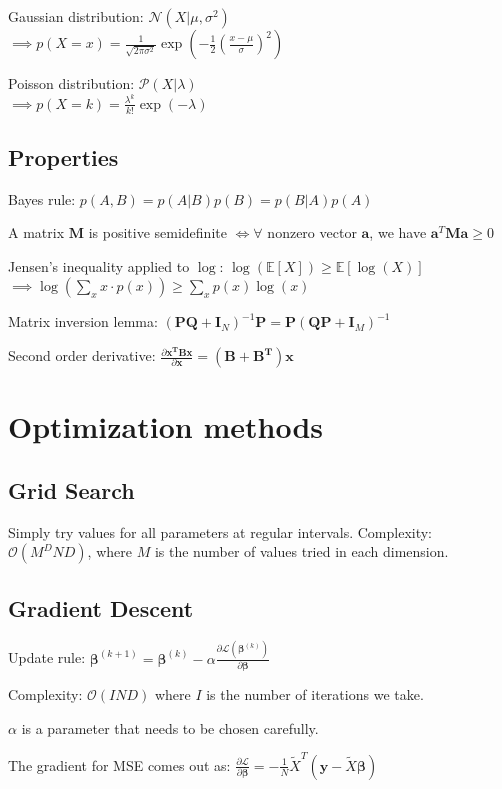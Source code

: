 \documentclass[10pt,a4paper,landscape]{article}
\providecommand{\bf}[1]{\ensuremath{\mathbf{#1}}}
\newcommand{\bbeta}{\boldsymbol\beta}
\begin{document}
\begin{multicols*}{4}
Gaussian distribution: $\mathcal{N}(X| \mu, \sigma^2)$ \\
$\implies p(X = x) = \frac{1}{\sqrt{2 \pi \sigma^2}} \exp{(- \frac{1}{2} ( \frac{x - \mu}{\sigma} )^2)}$

Poisson distribution: $\mathcal{P}(X| \lambda)$ \\
$\implies p(X = k) = \frac{\lambda ^ k}{k!} \exp{(- \lambda)}$

\subsection{Properties}
Bayes rule: $p(A, B) = p(A|B) p(B) = p(B|A) p(A)$

A matrix $\bf{M}$ is positive semidefinite $\iff \forall$ nonzero vector $\bf{a}$, we have $\bf{a}^T \bf{M} \bf{a} \geq 0$

Jensen's inequality applied to $\log$: $\log( \mathbb{E}[X] ) \geq \mathbb{E}[\log(X)]$ \\
$\implies \log ( \sum_x x \cdot p(x) ) \geq \sum_x p(x) \log(x)$

Matrix inversion lemma: $(\bf{PQ} + \bf{I}_N)^{-1} \bf{P} = \bf{P}(\bf{QP} + \bf{I}_M)^{-1}$

Second order derivative: $\frac{\partial \bf{x^T B x}}{\partial \bf{x}} = (\bf{B + B^T}) \bf{x}$

\section{Optimization methods}

\subsection{Grid Search}
Simply try values for all parameters at regular intervals.
Complexity: $\mathcal{O}(M^D N D)$, where $M$ is the number of values tried in each dimension.

\subsection{Gradient Descent}
Update rule: $\bbeta^{(k+1)} = \bbeta^{(k)} - \alpha \frac{\partial \mathcal{L}(\bbeta^{(k)})}{\partial \bbeta}$

Complexity: $\mathcal{O}(I N D)$ where $I$ is the number of iterations we take.

$\alpha$ is a parameter that needs to be chosen carefully.

The gradient for MSE comes out as:
$\frac{\partial \mathcal{L}}{\partial \bbeta} = - \frac{1}{N} \tilde{X}^T ( \boldsymbol y - \tilde{X} \bbeta )$


\end{multicols*}
\end{document}
